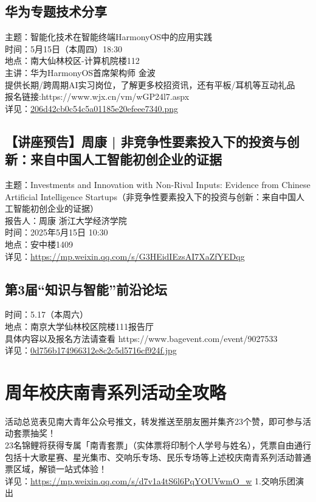 \documentclass[letterpaper, 12pt]{article}
\begin{document}
\begin{multicols}{2}
\subsection{华为专题技术分享} %
主题：智能化技术在智能终端HarmonyOS中的应用实践
\\时间：5月15日（本周四）18:30
\\地点：南大仙林校区-计算机院楼112
\\主讲：华为HarmonyOS首席架构师 金波
\\提供长期/跨周期AI实习岗位，了解更多校招资讯，还有平板/耳机等互动礼品
\\报名链接:https://www.wjx.cn/vm/wGP24l7.aspx
\\详见：\url{206d42cb0c54c5a01185e20efeee7340.png}

\subsection{【讲座预告】周康 | 非竞争性要素投入下的投资与创新：来自中国人工智能初创企业的证据} %
主题：Investments and Innovation with Non-Rival Inputs: Evidence from Chinese Artificial Intelligence Startups（非竞争性要素投入下的投资与创新：来自中国人工智能初创企业的证据）
\\报告人：周康 浙江大学经济学院
\\时间：2025年5月15日 10:30
\\地点：安中楼1409 
\\详见：\url{https://mp.weixin.qq.com/s/G3HEidIEzsAI7XaZfYEDqg}
\subsection{第3届“知识与智能”前沿论坛} %
时间：5.17（本周六）
\\地点：南京大学仙林校区院楼111报告厅
\\具体内容以及报名方法请查看 https://www.bagevent.com/event/9027533
\\详见：\url{0d756b174966312e8c2c5d5716cf924f.jpg}
\section{周年校庆南青系列活动全攻略} %
活动总览表见南大青年公众号推文，转发推送至朋友圈并集齐23个赞，即可参与活动套票抽奖！
\\23名锦鲤将获得专属「南青套票」（实体票将印制个人学号与姓名），凭票自由通行包括十大歌星赛、星光集市、交响乐专场、民乐专场等上述校庆南青系列活动普通票区域，解锁一站式体验！
\\详见：\url{https://mp.weixin.qq.com/s/d7v1a4tS6l6PqYOUVwmO_w}
1.交响乐团演出


\end{multicols}
\end{document}
